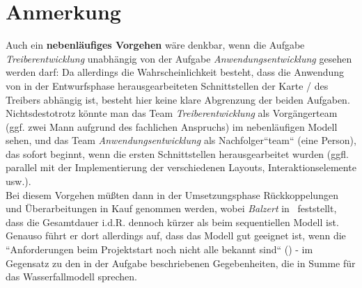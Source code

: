 \section*{Anmerkung}
Auch ein \textbf{nebenläufiges Vorgehen}  wäre denkbar, wenn die Aufgabe \textit{Treiberentwicklung} unabhängig von der Aufgabe \textit{Anwendungsentwicklung} gesehen werden darf: Da allerdings die Wahrscheinlichkeit besteht, dass die Anwendung von in der Entwurfsphase herausgearbeiteten Schnittstellen der Karte / des Treibers abhängig ist, besteht hier keine klare Abgrenzung der beiden Aufgaben.\\
Nichtsdestotrotz könnte man das Team \textit{Treiberentwicklung} als Vorgängerteam (ggf. zwei Mann aufgrund des fachlichen Anspruchs) im nebenläufigen Modell sehen, und das Team \textit{Anwendungsentwicklung} als Nachfolger``team`` (eine Person), das sofort beginnt, wenn die ersten Schnittstellen herausgearbeitet wurden (ggfl. parallel mit der Implementierung der verschiedenen Layouts, Interaktionselemente usw.).\\
Bei diesem Vorgehen müßten dann in der Umsetzungsphase Rückkoppelungen und Überarbeitungen in Kauf genommen werden, wobei
\textit{Balzert} in~\cite[522]{Bal08} feststellt, dass die Gesamtdauer i.d.R. dennoch kürzer als beim sequentiellen Modell ist.
Genauso führt er dort allerdings auf, dass das Modell gut geeignet ist, wenn die ``Anforderungen beim Projektstart noch nicht alle bekannt sind`` (\cite[524]{Bal08}) - im Gegensatz zu den in der Aufgabe beschriebenen Gegebenheiten, die in Summe für das Wasserfallmodell sprechen.
